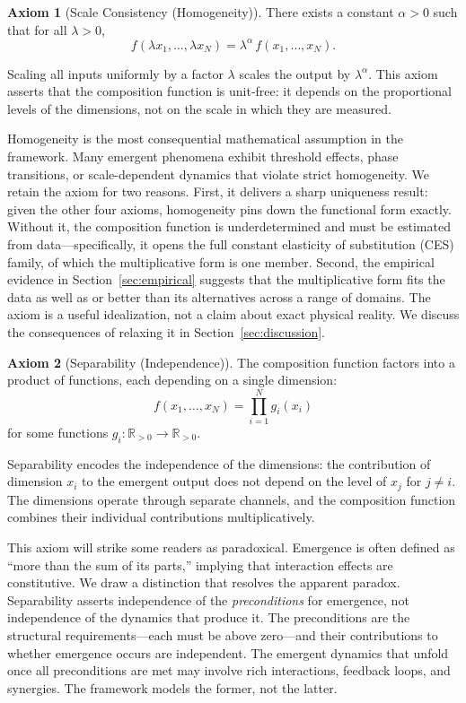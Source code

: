 \documentclass[12pt, a4paper]{article}
\theoremstyle{definition}
\newtheorem{axiom}{Axiom}
\theoremstyle{remark}
\newcommand{\Rp}{\mathbb{R}_{>0}}
\begin{document}
\begin{axiom}[Scale Consistency (Homogeneity)]\label{ax:scale}
There exists a constant $\alpha > 0$ such that for all $\lambda > 0$,
\[
f(\lambda x_1, \ldots, \lambda x_N) = \lambda^\alpha \, f(x_1, \ldots, x_N).
\]
\end{axiom}

\noindent Scaling all inputs uniformly by a factor $\lambda$ scales the output by $\lambda^\alpha$. This axiom asserts that the composition function is unit-free: it depends on the proportional levels of the dimensions, not on the scale in which they are measured.

Homogeneity is the most consequential mathematical assumption in the framework. Many emergent phenomena exhibit threshold effects, phase transitions, or scale-dependent dynamics that violate strict homogeneity. We retain the axiom for two reasons. First, it delivers a sharp uniqueness result: given the other four axioms, homogeneity pins down the functional form exactly. Without it, the composition function is underdetermined and must be estimated from data---specifically, it opens the full constant elasticity of substitution (CES) family, of which the multiplicative form is one member. Second, the empirical evidence in Section~\ref{sec:empirical} suggests that the multiplicative form fits the data as well as or better than its alternatives across a range of domains. The axiom is a useful idealization, not a claim about exact physical reality. We discuss the consequences of relaxing it in Section~\ref{sec:discussion}.

\begin{axiom}[Separability (Independence)]\label{ax:sep}
The composition function factors into a product of functions, each depending on a single dimension:
\[
f(x_1, \ldots, x_N) = \prod_{i=1}^{N} g_i(x_i)
\]
for some functions $g_i : \Rp \to \Rp$.
\end{axiom}

\noindent Separability encodes the independence of the dimensions: the contribution of dimension $x_i$ to the emergent output does not depend on the level of $x_j$ for $j \neq i$. The dimensions operate through separate channels, and the composition function combines their individual contributions multiplicatively.

This axiom will strike some readers as paradoxical. Emergence is often defined as ``more than the sum of its parts,'' implying that interaction effects are constitutive. We draw a distinction that resolves the apparent paradox. Separability asserts independence of the \textit{preconditions} for emergence, not independence of the dynamics that produce it. The preconditions are the structural requirements---each must be above zero---and their contributions to whether emergence occurs are independent. The emergent dynamics that unfold once all preconditions are met may involve rich interactions, feedback loops, and synergies. The framework models the former, not the latter.
\end{document}
